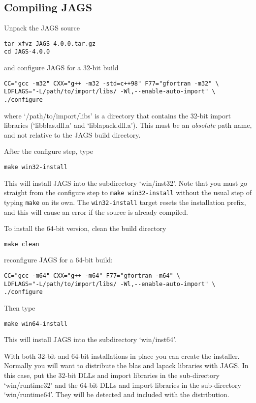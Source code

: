 \documentclass[11pt, a4paper, titlepage]{article}
\newcommand{\JAGS}{\textsf{JAGS}}
\newcommand{\file}[1]{{`\normalfont\textsf{#1}'}}
\begin{document}
\subsection{Compiling \JAGS}

Unpack the JAGS source
\begin{verbatim}
tar xfvz JAGS-4.0.0.tar.gz
cd JAGS-4.0.0
\end{verbatim}
and configure JAGS for a 32-bit build
\begin{verbatim}
CC="gcc -m32" CXX="g++ -m32 -std=c++98" F77="gfortran -m32" \
LDFLAGS="-L/path/to/import/libs/ -Wl,--enable-auto-import" \
./configure
\end{verbatim}
where \file{/path/to/import/libs} is a directory that contains the
32-bit import libraries (\file{libblas.dll.a} and
\file{liblapack.dll.a}).  This must be an {\em absolute} path name,
and not relative to the JAGS build directory.


After the configure step, type
\begin{verbatim}
make win32-install
\end{verbatim}
This will install JAGS into the subdirectory \file{win/inst32}.
Note that you must go straight from the configure step to \texttt{make
  win32-install} without the usual step of typing \texttt{make} on
its own.  The \texttt{win32-install} target resets the installation
prefix, and this will cause an error if the source is already
compiled.

To install the 64-bit version, clean the build directory 
\begin{verbatim}
make clean 
\end{verbatim}
reconfigure JAGS for a 64-bit build:
\begin{verbatim}
CC="gcc -m64" CXX="g++ -m64" F77="gfortran -m64" \
LDFLAGS="-L/path/to/import/libs/ -Wl,--enable-auto-import" \
./configure
\end{verbatim}
Then type
\begin{verbatim}
make win64-install
\end{verbatim}
This will install JAGS into the subdirectory \file{win/inst64}.

With both 32-bit and 64-bit installations in place you can create the
installer.  Normally you will want to distribute the blas and lapack
libraries with JAGS.  In this case, put the 32-bit DLLs and import
libraries in the sub-directory \file{win/runtime32} and the 64-bit
DLLs and import libraries in the sub-directory
\file{win/runtime64}. They will be detected and included with the
distribution.
\end{document}
